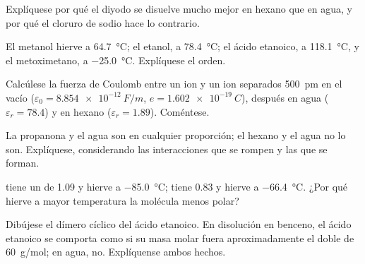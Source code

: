 \begin{exercise}[$\star$]\label{exo:b1:intermolecular-forces-solvents:4}
Explíquese por qué el diyodo se disuelve mucho mejor en hexano que en
agua, y por qué el cloruro de sodio hace lo contrario.
\end{exercise}

\begin{exercise}[$\star\star$]\label{exo:b1:intermolecular-forces-solvents:5}
El metanol hierve a \qty{64.7}{\celsius}; el etanol, a
\qty{78.4}{\celsius}; el ácido etanoico, a \qty{118.1}{\celsius}, y el
metoximetano, a \qty{-25.0}{\celsius}. Explíquese el orden.
\end{exercise}

\begin{exercise}[$\star\star$]\label{exo:b1:intermolecular-forces-solvents:6}
Calcúlese la fuerza de Coulomb entre un ion  y un ion 
separados \qty{500}{pm} en el vacío ($\varepsilon_0 = \qty{8.854e-12}{F/m}$,
$e = \qty{1.602e-19}{C}$), después en agua ($\varepsilon_r = 78.4$) y en
hexano ($\varepsilon_r = 1.89$). Coméntese.
\end{exercise}

\begin{exercise}[$\star\star$]\label{exo:b1:intermolecular-forces-solvents:7}
La propanona y el agua son  en cualquier proporción; el hexano y
el agua no lo son. Explíquese, considerando las interacciones que se
rompen y las que se forman.
\end{exercise}

\begin{exercise}[$\star\star$]\label{exo:b1:intermolecular-forces-solvents:8}
 tiene un  de \qty{1.09}{\debye} y hierve a
\qty{-85.0}{\celsius};  tiene \qty{0.83}{\debye} y hierve a
\qty{-66.4}{\celsius}. ¿Por qué hierve a mayor temperatura la molécula
menos polar?
\end{exercise}

\begin{exercise}[$\star\star$]\label{exo:b1:intermolecular-forces-solvents:9}
Dibújese el dímero cíclico del ácido etanoico. En disolución en benceno,
el ácido etanoico se comporta como si su masa molar fuera aproximadamente
el doble de \qty{60}{g/mol}; en agua, no. Explíquense ambos hechos.
\end{exercise}

